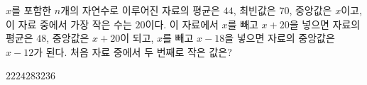 $x$를 포함한 $n$개의 자연수로 이루어진 자료의 평균은 $44$, 최빈값은 $70$, 중앙값은 $x$이고, 이 자료 중에서 가장 작은 수는 $20$이다. 이 자료에서 $x$를 빼고 $x+20$을 넣으면 자료의 평균은 $48$, 중앙값은 $x+20$이 되고, $x$를 빼고 $x-18$을 넣으면 자료의 중앙값은 $x-12$가 된다. 처음 자료 중에서 두 번째로 작은 값은?
\begin{choices32}{$22$}{$24$}{$28$}{$32$}{$36$}\end{choices32}
